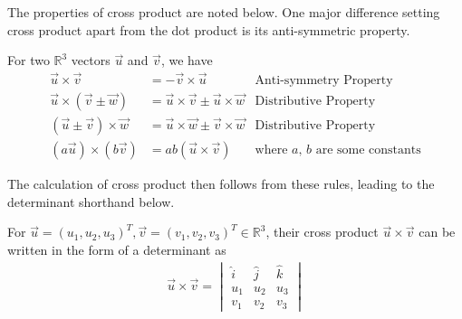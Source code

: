 \par
The properties of cross product are noted below. One major difference setting cross product apart from the dot product is its anti-symmetric property.
\begin{proper}
\label{proper:crossproper}
For two $\mathbb{R}^3$ vectors $\vec{u}$ and $\vec{v}$, we have
\begin{align*}
\vec{u} \times \vec{v} &= -\vec{v} \times \vec{u} &\text{Anti-symmetry Property} \\
\vec{u} \times (\vec{v} \pm \vec{w}) &= \vec{u} \times \vec{v} \pm \vec{u} \times \vec{w} &\text{Distributive Property} \\
(\vec{u} \pm \vec{v}) \times \vec{w} &= \vec{u} \times \vec{w} \pm \vec{v} \times \vec{w} &\text{Distributive Property} \\
(a\vec{u}) \times (b\vec{v}) &= ab(\vec{u} \times \vec{v}) &\text{where $a$, $b$ are some constants}
\end{align*}
\end{proper}
The calculation of cross product then follows from these rules, leading to the determinant shorthand below. 
\begin{proper}
\label{proper:crossdet}
For $\vec{u} = (u_1, u_2, u_3)^T, \vec{v} = (v_1, v_2, v_3)^T \in \mathbb{R}^3$, their cross product $\vec{u} \times \vec{v}$ can be written in the form of a determinant as
\begin{align*}
\vec{u} \times \vec{v} =
\begin{vmatrix}
\hat{i} & \hat{j} & \hat{k} \\
u_1 & u_2 & u_3 \\
v_1 & v_2 & v_3
\end{vmatrix}
\end{align*}
\end{proper}
